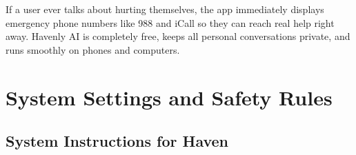 \documentclass[USenglish,a4paper,12pt]{nitathesis}
\renewcommand{\headrulewidth}{0.5pt}
\begin{document}
If a user ever talks about hurting themselves, the app immediately displays emergency phone numbers like 988 and iCall so they can reach real help right away. Havenly AI is completely free, keeps all personal conversations private, and runs smoothly on phones and computers.

\renewcommand{\headrulewidth}{0.5pt}
\pagestyle{fancy}
\fancyhead[RO,RE]{\nouppercase\rightmark}
\fancyfoot[C]{\thepage}
\tableofcontents
\newpage

\setcounter{page}{1}   

\fancyhf{}
\fancyhead[RO]{\slshape\nouppercase\rightmark{}}
\fancyhead[RE]{\slshape\nouppercase\leftmark{}}
\cfoot{\thepage}
\pagestyle{fancy}

\flushbottom

\flushbottom

\flushbottom

\flushbottom

\flushbottom

\flushbottom

\flushbottom

\flushbottom

\flushbottom

\flushbottom

\flushbottom

\flushbottom

\small


\appendix
\chapter{System Settings and Safety Rules}
\label{app:prompts}

\section{System Instructions for Haven}
\end{document}
